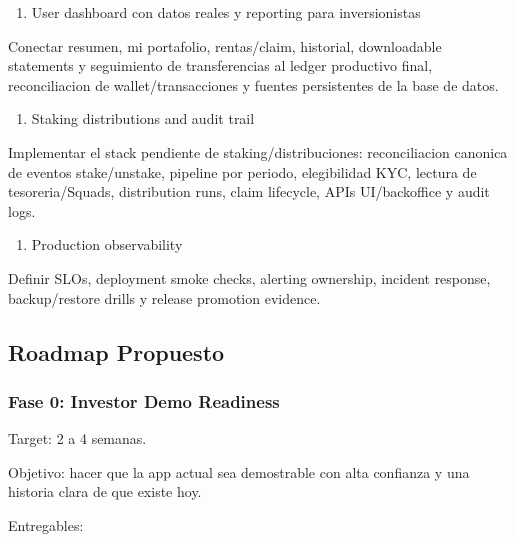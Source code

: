 \documentclass[
  10pt,
  letterpaper,
]{article}
\providecommand{\tightlist}{%
  \setlength{\itemsep}{0pt}\setlength{\parskip}{0pt}}
\begin{document}
\begin{enumerate}
\def\labelenumi{\arabic{enumi}.}
\setcounter{enumi}{7}
\tightlist
\item
  User dashboard con datos reales y reporting para inversionistas
\end{enumerate}

Conectar resumen, mi portafolio, rentas/claim, historial, downloadable
statements y seguimiento de transferencias al ledger productivo final,
reconciliacion de wallet/transacciones y fuentes persistentes de la base
de datos.

\begin{enumerate}
\def\labelenumi{\arabic{enumi}.}
\setcounter{enumi}{8}
\tightlist
\item
  Staking distributions and audit trail
\end{enumerate}

Implementar el stack pendiente de staking/distribuciones: reconciliacion
canonica de eventos stake/unstake, pipeline por periodo, elegibilidad
KYC, lectura de tesoreria/Squads, distribution runs, claim lifecycle,
APIs UI/backoffice y audit logs.

\begin{enumerate}
\def\labelenumi{\arabic{enumi}.}
\setcounter{enumi}{9}
\tightlist
\item
  Production observability
\end{enumerate}

Definir SLOs, deployment smoke checks, alerting ownership, incident
response, backup/restore drills y release promotion evidence.

\subsection{Roadmap Propuesto}\label{roadmap-propuesto}

\subsubsection{Fase 0: Investor Demo
Readiness}\label{fase-0-investor-demo-readiness}

Target: 2 a 4 semanas.

Objetivo: hacer que la app actual sea demostrable con alta confianza y
una historia clara de que existe hoy.

Entregables:
\end{document}
